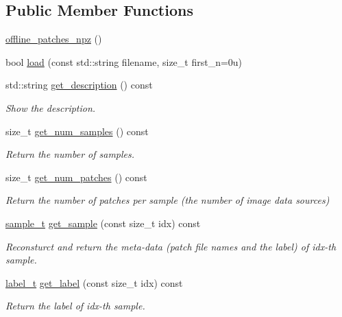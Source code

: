 \subsection*{Public Member Functions}
\begin{DoxyCompactItemize}
\item 
\hyperlink{classlbann_1_1offline__patches__npz_a6beaea209f8e0e7a70587bbe31d793a0}{offline\+\_\+patches\+\_\+npz} ()
\item 
bool \hyperlink{classlbann_1_1offline__patches__npz_a29f1d64e32c857018d5ef21dd99fe7c4}{load} (const std\+::string filename, size\+\_\+t first\+\_\+n=0u)
\item 
std\+::string \hyperlink{classlbann_1_1offline__patches__npz_a9ffc5cc4b431a4ad18cd58651ca05ef8}{get\+\_\+description} () const
\begin{DoxyCompactList}\small\item\em Show the description. \end{DoxyCompactList}\item 
size\+\_\+t \hyperlink{classlbann_1_1offline__patches__npz_aa6fa05575f54a29b67d0bba8a2a9d363}{get\+\_\+num\+\_\+samples} () const
\begin{DoxyCompactList}\small\item\em Return the number of samples. \end{DoxyCompactList}\item 
size\+\_\+t \hyperlink{classlbann_1_1offline__patches__npz_a153f67de70844a6820aa472f91a6245e}{get\+\_\+num\+\_\+patches} () const
\begin{DoxyCompactList}\small\item\em Return the number of patches per sample (the number of image data sources) \end{DoxyCompactList}\item 
\hyperlink{classlbann_1_1offline__patches__npz_a61405205f907a697515786d0a9e7858a}{sample\+\_\+t} \hyperlink{classlbann_1_1offline__patches__npz_a9c8ad05ffdf0d44ee1c9b61740dd42e3}{get\+\_\+sample} (const size\+\_\+t idx) const
\begin{DoxyCompactList}\small\item\em Reconsturct and return the meta-\/data (patch file names and the label) of idx-\/th sample. \end{DoxyCompactList}\item 
\hyperlink{classlbann_1_1offline__patches__npz_ae0ed6bf62b2be1814964206522ed4e05}{label\+\_\+t} \hyperlink{classlbann_1_1offline__patches__npz_a7548019f8e7f768027b50d497c4e6e73}{get\+\_\+label} (const size\+\_\+t idx) const
\begin{DoxyCompactList}\small\item\em Return the label of idx-\/th sample. \end{DoxyCompactList}\end{DoxyCompactItemize}
